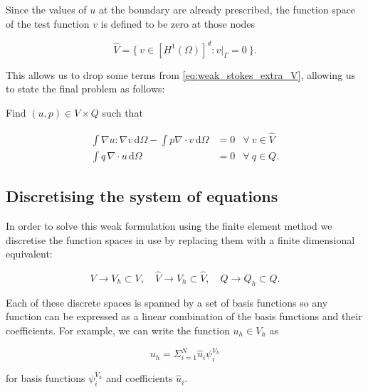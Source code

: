 \documentclass[thesis]{subfiles}
\begin{document}
Since the values of $u$ at the boundary are already prescribed, the function space of the test function $v$ is defined to be zero at those nodes

\begin{equation*}
  \hat V = \{\ v \in [H^1(\Omega)]^d : v|_{\Gamma} = 0 \ \}.
\end{equation*}

This allows us to drop some terms from \cref{eq:weak_stokes_extra_V}, allowing us to state the final problem as follows:

\vspace{1em}

Find $(u, p) \in V \times Q$ such that

\begin{subequations}
  \begin{align}
    \int \nabla u : \nabla v \, \textrm{d}\Omega
    - \int p \nabla \cdot v \, \textrm{d}\Omega
    &= 0
    &\forall \ v \in \hat V
    \label{eq:weak_stokes_V} \\
    \int q \, \nabla \cdot u \, \textrm{d}\Omega
    &= 0
    &\forall \ q \in Q.
    \label{eq:weak_stokes_Q}
  \end{align}
  \label{eq:weak_stokes}
\end{subequations}

\subsection{Discretising the system of equations}

In order to solve this weak formulation using the finite element method we discretise the function spaces in use by replacing them with a finite dimensional equivalent:

\begin{equation*}
  V \to V_h \subset V,
  \quad
  \hat V \to \hat V_h \subset \hat V,
  \quad
  Q \to Q_h \subset Q.
\end{equation*}

Each of these discrete spaces is spanned by a set of basis functions so any function can be expressed as a linear combination of the basis functions and their coefficients.
For example, we can write the function $u_h \in V_h$ as

\begin{equation*}
  u_h = \Sigma^N_{i=1} \hat u_i \psi^{V_h}_i
\end{equation*}

for basis functions $\psi^{V_h}_i$ and coefficients $\hat u_i$.
\end{document}
